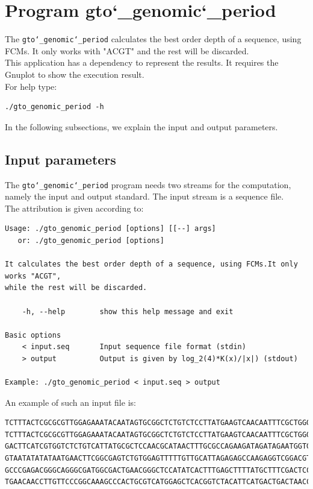 \section{Program gto\char`_genomic\char`_period}
The \texttt{gto\char`_genomic\char`_period} calculates the best order depth of a sequence, using FCMs. It only works with "ACGT" and the rest will be discarded.\\
This application has a dependency to represent the results. It requires the Gnuplot to show the execution result.\\
For help type:
\begin{lstlisting}
./gto_genomic_period -h
\end{lstlisting}
In the following subsections, we explain the input and output parameters.

\subsection*{Input parameters}

The \texttt{gto\char`_genomic\char`_period} program needs two streams for the computation, namely the input and output standard. The input stream is a sequence file.\\
The attribution is given according to:
\begin{lstlisting}
Usage: ./gto_genomic_period [options] [[--] args]
   or: ./gto_genomic_period [options]

It calculates the best order depth of a sequence, using FCMs.It only works "ACGT", 
while the rest will be discarded.

    -h, --help        show this help message and exit

Basic options
    < input.seq       Input sequence file format (stdin)
    > output          Output is given by log_2(4)*K(x)/|x|) (stdout)

Example: ./gto_genomic_period < input.seq > output
\end{lstlisting}
An example of such an input file is:
\begin{lstlisting}
TCTTTACTCGCGCGTTGGAGAAATACAATAGTGCGGCTCTGTCTCCTTATGAAGTCAACAATTTCGCTGGGACTTGCGGC
TCTTTACTCGCGCGTTGGAGAAATACAATAGTGCGGCTCTGTCTCCTTATGAAGTCAACAATTTCGCTGGGACTTGCGGC
GACTTCATCGTGGTCTCTGTCATTATGCGCTCCAACGCATAACTTTGCGCCAGAAGATAGATAGAATGGTGTAAGAAACT
GTAATATATATAATGAACTTCGGCGAGTCTGTGGAGTTTTTGTTGCATTAGAGAGCCAAGAGGTCGGACGTCCTCACGTA
GCCCGAGACGGGCAGGGCGATGGCGACTGAACGGGCTCCATATCACTTTGAGCTTTTATGCTTTCGACTCCTCCAGGAGC
TGAACAACCTTGTTCCCGGCAAAGCCCACTGCGTCATGGAGCTCACGGTCTACATTCATGACTGACTAACCGTAAACTGC
\end{lstlisting}

